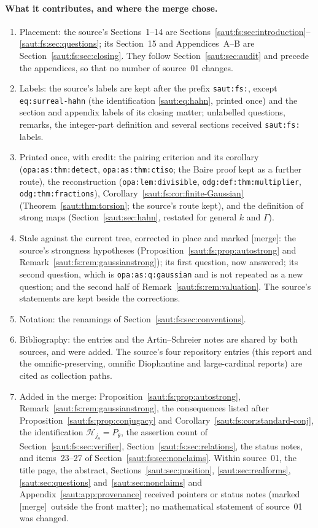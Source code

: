 \documentclass[11pt]{article}
\theoremstyle{definition}
\theoremstyle{remark}
\newcommand{\lbl}[1]{\nolinkurl{#1}}%
\newcommand{\mergetag}{\textup{[merge]}}
\numberwithin{equation}{section}
\begin{document}
\paragraph{What it contributes, and where the merge chose.}
\begin{enumerate}[label=(\arabic*)]
\item Placement: the source's Sections~1--14 are
Sections~\ref{saut:fs:sec:introduction}--\ref{saut:fs:sec:questions}; its
Section~15 and Appendices~A--B are Section~\ref{saut:fs:sec:closing}. They follow
Section~\ref{saut:sec:audit} and precede the appendices, so that no number of
source~01 changes.
\item Labels: the source's labels are kept after the prefix \texttt{saut:fs:}, except
\texttt{eq:surreal-hahn} (the identification \eqref{saut:eq:hahn}, printed once) and
the section and appendix labels of its closing matter; unlabelled questions, remarks,
the integer-part definition and several sections received \texttt{saut:fs:} labels.
\item Printed once, with credit: the pairing criterion and its corollary
(\lbl{opa:as:thm:detect}, \lbl{opa:as:thm:ctiso}; the Baire proof kept as a further
route), the reconstruction (\lbl{opa:lem:divisible}, \lbl{odg:def:thm:multiplier},
\lbl{odg:thm:fractions}), Corollary~\ref{saut:fs:cor:finite-Gaussian}
(Theorem~\ref{saut:thm:torsion}; the source's route kept), and the definition of strong
maps (Section~\ref{saut:sec:hahn}, restated for general $k$ and $\Gamma$).
\item Stale against the current tree, corrected in place and marked \mergetag: the
source's strongness hypotheses (Proposition~\ref{saut:fs:prop:autostrong} and
Remark~\ref{saut:fs:rem:gaussianstrong}); its first question, now answered; its
second question, which is \lbl{opa:as:q:gaussian} and is not repeated as a new
question; and the second half of Remark~\ref{saut:fs:rem:valuation}. The source's
statements are kept beside the corrections.
\item Notation: the renamings of Section~\ref{saut:fs:sec:conventions}.
\item Bibliography: the entries \cite{Conway,Gonshor,KS,KKS} and the Artin--Schreier
notes \cite{Conrad} are shared by both sources, and \cite{Poonen,Lang,Wiki} were
added. The source's four repository entries (this report and the omnific-preserving,
omnific Diophantine and large-cardinal reports) are cited as collection paths.
\item Added in the merge: Proposition~\ref{saut:fs:prop:autostrong},
Remark~\ref{saut:fs:rem:gaussianstrong}, the consequences listed after
Proposition~\ref{saut:fs:prop:conjugacy} and Corollary~\ref{saut:fs:cor:standard-conj},
the identification $\mathcal H_{j_\theta}=P_\theta$, the assertion count of
Section~\ref{saut:fs:sec:verifier}, Section~\ref{saut:fs:sec:relations}, the status
notes, and items~23--27 of Section~\ref{saut:fs:sec:nonclaims}. Within
source~01, the title page, the abstract, Sections~\ref{saut:sec:position},
\ref{saut:sec:realforms}, \ref{saut:sec:questions} and~\ref{saut:sec:nonclaims} and
Appendix~\ref{saut:app:provenance} received pointers or status notes (marked
\mergetag\ outside the front matter); no mathematical statement of source~01 was
changed.
\end{enumerate}
\end{document}
